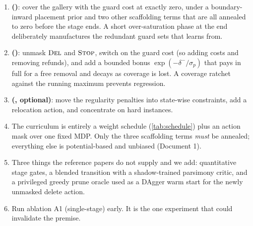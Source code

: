 \documentclass[11pt,a4paper]{article}
\begin{document}
\begin{enumerate}[label=\textbf{\arabic*.}]
  \item \textbf{\stageI{} (\stageI{})}: cover the gallery with the guard cost at exactly zero,
        under a boundary-inward placement prior and two other scaffolding terms that are all
        annealed to zero before the stage ends. A short over-saturation phase at the end
        deliberately manufactures the redundant guard sets that \stageII{} learns from.
  \item \textbf{\stageII{} (\stageII{})}: unmask $\textsc{Del}$ and $\textsc{Stop}$, switch on the guard cost
        (so adding costs and removing refunds), and add a bounded bonus
        $\exp(-\delta^{-}/\sigma_p)$ that pays in full for a free removal and decays as
        coverage is lost. A coverage ratchet against the running maximum prevents regression.
  \item \textbf{\stageIII{} (\stageIII{}, optional)}: move the regularity penalties into
        state-wise constraints, add a relocation action, and concentrate on hard instances.
  \item The curriculum is entirely a weight schedule (\cref{tab:schedule}) plus an action
        mask over one fixed MDP. Only the three scaffolding terms \emph{must} be annealed;
        everything else is potential-based and unbiased (Document 1).
  \item Three things the reference papers do not supply and we add: quantitative
        stage gates, a blended transition with a shadow-trained parsimony critic, and a
        privileged greedy prune oracle used as a DAgger warm start for the newly unmasked
        delete action.
  \item Run ablation A1 (single-stage) early. It is the one experiment that could invalidate
        the premise.
\end{enumerate}


\renewcommand{\refname}{References}

\end{document}
